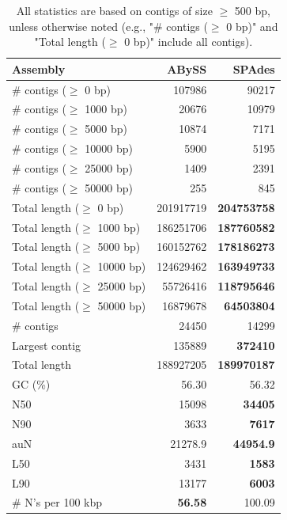 \documentclass[12pt,a4paper]{article}
\begin{document}
\begin{table}[ht]
\begin{center}
\caption{All statistics are based on contigs of size $\geq$ 500 bp, unless otherwise noted (e.g., "\# contigs ($\geq$ 0 bp)" and "Total length ($\geq$ 0 bp)" include all contigs).}
\begin{tabular}{|l*{2}{|r}|}
\hline
Assembly & ABySS & SPAdes \\ \hline
\# contigs ($\geq$ 0 bp) & 107986 & 90217 \\ \hline
\# contigs ($\geq$ 1000 bp) & 20676 & 10979 \\ \hline
\# contigs ($\geq$ 5000 bp) & 10874 & 7171 \\ \hline
\# contigs ($\geq$ 10000 bp) & 5900 & 5195 \\ \hline
\# contigs ($\geq$ 25000 bp) & 1409 & 2391 \\ \hline
\# contigs ($\geq$ 50000 bp) & 255 & 845 \\ \hline
Total length ($\geq$ 0 bp) & 201917719 & {\bf 204753758} \\ \hline
Total length ($\geq$ 1000 bp) & 186251706 & {\bf 187760582} \\ \hline
Total length ($\geq$ 5000 bp) & 160152762 & {\bf 178186273} \\ \hline
Total length ($\geq$ 10000 bp) & 124629462 & {\bf 163949733} \\ \hline
Total length ($\geq$ 25000 bp) & 55726416 & {\bf 118795646} \\ \hline
Total length ($\geq$ 50000 bp) & 16879678 & {\bf 64503804} \\ \hline
\# contigs & 24450 & 14299 \\ \hline
Largest contig & 135889 & {\bf 372410} \\ \hline
Total length & 188927205 & {\bf 189970187} \\ \hline
GC (\%) & 56.30 & 56.32 \\ \hline
N50 & 15098 & {\bf 34405} \\ \hline
N90 & 3633 & {\bf 7617} \\ \hline
auN & 21278.9 & {\bf 44954.9} \\ \hline
L50 & 3431 & {\bf 1583} \\ \hline
L90 & 13177 & {\bf 6003} \\ \hline
\# N's per 100 kbp & {\bf 56.58} & 100.09 \\ \hline
\end{tabular}
\end{center}
\end{table}
\end{document}
